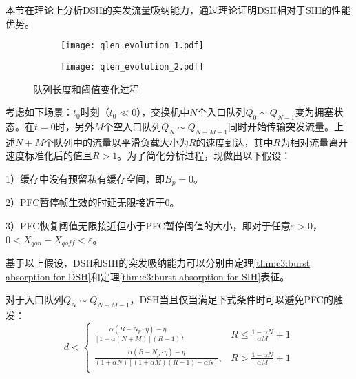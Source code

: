 \label{c3:s4:dsh analysis}

本节在理论上分析DSH的突发流量吸纳能力，通过理论证明DSH相对于SIH的性能优势。

\begin{figure}[H]
  \begin{subfigure}[b]{0.49\linewidth}
      \centering
      \texttt{[image: qlen\_evolution\_1.pdf]}
      \label{c3:s4:ss2:fig:sub1:dsh qlen evaluation 1}
  \end{subfigure}
  \begin{subfigure}[b]{0.49\linewidth}
      \centering
      \texttt{[image: qlen\_evolution\_2.pdf]}
      \label{c3:s4:ss2:fig:sub2:dsh qlen evaluation 2}
  \end{subfigure}
  \caption{队列长度和阈值变化过程}
  \label{c3:s4:ss2:fig:dsh qlen evaluation}
\end{figure}


考虑如下场景\cite{TON98DT}：$t_0$时刻（$t_0 \ll 0$），交换机中$N$个入口队列$Q_0 \sim Q_{N-1}$变为拥塞状态。在$t=0$时，另外$M$个空入口队列$Q_N \sim Q_{N+M-1}$同时开始传输突发流量。上述$N+M$个队列中的流量以平滑负载大小为$R$的速度到达，其中$R$为相对流量离开速度标准化后的值且$R>1$。为了简化分析过程，现做出以下假设：

1）缓存中没有预留私有缓存空间，即$B_p=0$。

2）PFC暂停帧生效的时延无限接近于0。

3）PFC恢复阈值无限接近但小于PFC暂停阈值的大小，即对于任意$\varepsilon > 0$，$0<X_{qon} - X_{\mathit{qoff}}<\varepsilon$。

基于以上假设，DSH和SIH的突发吸纳能力可以分别由定理\ref{thm:c3:burst absorption for DSH}和定理\ref{thm:c3:burst absorption for SIH}表征。


\begin{theorem}
  对于入口队列$Q_N \sim Q_{N+M-1}$，DSH当且仅当满足下式条件时可以避免PFC的触发：
  \label{thm:c3:burst absorption for DSH}
  \begin{equation}
    d < 
    \begin{cases}
      \frac{\alpha(B-N_p\cdot \eta)-\eta}{[1+\alpha(N+M)](R-1)}, & R\leqslant\frac{1-\alpha N}{\alpha M}+1 \\
      \frac{\alpha(B-N_p\cdot \eta)-\eta}{(1+\alpha N)[(1+\alpha M)(R-1)-\alpha N]}, & R>\frac{1-\alpha N}{\alpha M}+1 \\
    \end{cases}
    \label{eqn:c3:port pause threshold}
  \end{equation}
  
\end{theorem}

